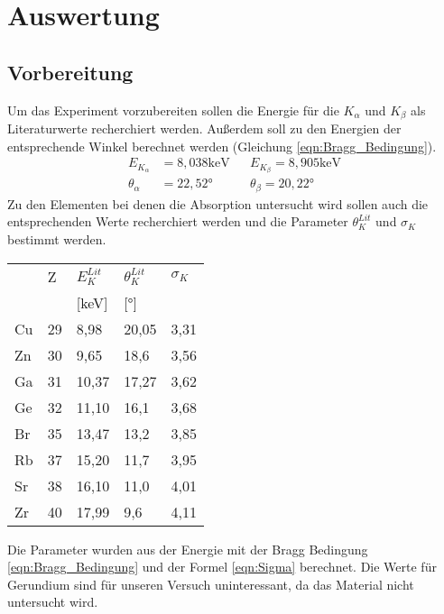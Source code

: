 \section{Auswertung}
\label{sec:Auswertung}
\subsection{Vorbereitung}
Um das Experiment vorzubereiten sollen die Energie für die $K_{\alpha}$ und $K_{\beta}$ als Literaturwerte recherchiert werden.
Außerdem soll zu den Energien der entsprechende Winkel berechnet werden (Gleichung \ref{eqn:Bragg_Bedingung}).
\begin{align}
    E_{K_{\alpha}} &= 8,038 \text{keV} && E_{K_{\beta}} = 8,905 \text{keV} \nonumber \\
    \theta_{\alpha} &= 22,52°    &&      \theta_{\beta} = 20,22° \nonumber
\end{align}
Zu den Elementen bei denen die Absorption untersucht wird sollen auch die entsprechenden Werte recherchiert werden und die Parameter $\theta_K^{Lit}$ und $\sigma_K$ bestimmt werden.
\begin{table}[H]
\centering
\begin{tabular}{lllll}
  & Z & $E_K^{Lit}$ & $\theta_K^{Lit}$ & $\sigma_K$\\
  &   & [keV] & [°] &  \\
  \toprule
Cu & 29 & 8,98 & 20,05 & 3,31\\
\midrule
Zn & 30 & 9,65 & 18,6 & 3,56\\
\midrule
Ga & 31 & 10,37 & 17,27 & 3,62\\
\midrule
Ge & 32 & 11,10 & 16,1 & 3,68\\ 
\midrule
Br & 35 & 13,47 & 13,2 & 3,85\\ 
\midrule
Rb & 37 & 15,20 & 11,7 & 3,95\\ 
\midrule
Sr & 38 & 16,10 & 11,0 & 4,01\\
\midrule
Zr & 40 & 17,99 & 9,6 & 4,11\\
\bottomrule
\end{tabular}
\end{table}
Die Parameter wurden aus der Energie mit der Bragg Bedingung \ref{eqn:Bragg_Bedingung} und der Formel \ref{eqn:Sigma} berechnet.
Die Werte für Gerundium sind für unseren Versuch uninteressant, da das Material nicht untersucht wird.

